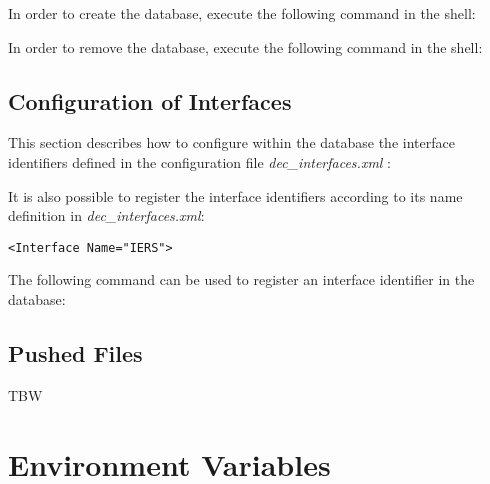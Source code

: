 \documentclass[dec_sum_main.tex]{subfiles}
\begin{document}
\par

\noindent
In order to create the database, execute the following command in the shell:

 \newline


\par 

\noindent
In order to remove the database, execute the following command in the shell:



\subsection{Configuration of Interfaces}

This section describes how to configure within the database the interface identifiers defined in the configuration file \textit{dec\_interfaces.xml} :

 \newline

\par

\noindent
It is also possible to register the interface identifiers according to its name definition in \textit{dec\_interfaces.xml}: \begin{verbatim}<Interface Name="IERS">\end{verbatim} 

\par 
\noindent
\noindent
The following command can be used to register an interface identifier in the database:

 \newline





\subsection{Pushed Files}
TBW


\section{Environment Variables}
\end{document}
